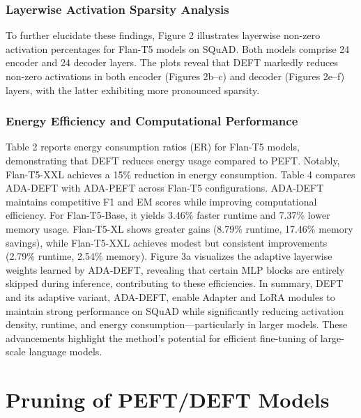 \documentclass[11pt,a4paper]{article}
\begin{document}
\subsubsection*{Layerwise Activation Sparsity Analysis}
To further elucidate these findings, Figure 2 illustrates layerwise non-zero activation percentages for Flan-T5 models on SQuAD. Both models comprise 24 encoder and 24 decoder layers. The plots reveal that DEFT markedly reduces non-zero activations in both encoder (Figures 2b–c) and decoder (Figures 2e–f) layers, with the latter exhibiting more pronounced sparsity.
\subsubsection*{Energy Efficiency and Computational Performance}
Table 2 reports energy consumption ratios (ER) for Flan-T5 models, demonstrating that DEFT reduces energy usage compared to PEFT. Notably, Flan-T5-XXL achieves a 15\% reduction in energy consumption. Table 4 compares ADA-DEFT with ADA-PEFT across Flan-T5 configurations. ADA-DEFT maintains competitive F1 and EM scores while improving computational efficiency. For Flan-T5-Base, it yields 3.46\% faster runtime and 7.37\% lower memory usage. Flan-T5-XL shows greater gains (8.79\% runtime, 17.46\% memory savings), while Flan-T5-XXL achieves modest but consistent improvements (2.79\% runtime, 2.54\% memory). Figure 3a visualizes the adaptive layerwise weights learned by ADA-DEFT, revealing that certain MLP blocks are entirely skipped during inference, contributing to these efficiencies. In summary, DEFT and its adaptive variant, ADA-DEFT, enable Adapter and LoRA modules to maintain strong performance on SQuAD while significantly reducing activation density, runtime, and energy consumption—particularly in larger models. These advancements highlight the method's potential for efficient fine-tuning of large-scale language models.




\section{Pruning of PEFT/DEFT Models}
\end{document}
